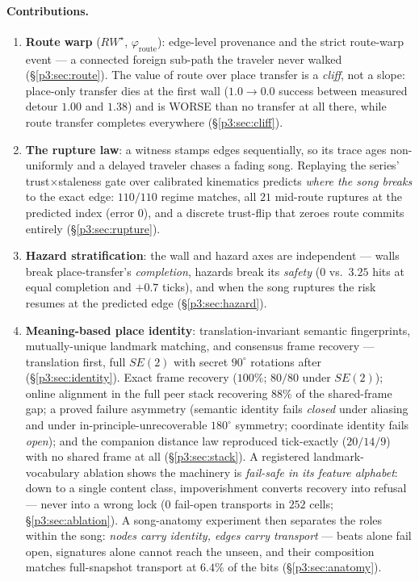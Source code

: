 \documentclass{article}
\newcommand{\rwstar}{RW^{\star}}
\newcommand{\phiroute}{\varphi_{\mathrm{route}}}
\begin{document}
\paragraph{Contributions.}
\begin{enumerate}[leftmargin=20pt,itemsep=2pt,topsep=2pt]
\item \textbf{Route warp} ($\rwstar$, $\phiroute$): edge-level
  provenance and the strict route-warp event --- a connected foreign
  sub-path the traveler never walked (\S\ref{p3:sec:route}). The value of
  route over place transfer is a \emph{cliff}, not a slope: place-only
  transfer dies at the first wall ($1.0 \to 0.0$ success between
  measured detour $1.00$ and $1.38$) and is WORSE than no transfer at
  all there, while route transfer completes everywhere
  (\S\ref{p3:sec:cliff}).
\item \textbf{The rupture law}: a witness stamps edges sequentially,
  so its trace ages non-uniformly and a delayed traveler chases a
  fading song. Replaying the series' trust$\times$staleness gate over
  calibrated kinematics predicts \emph{where the song breaks} to the
  exact edge: $110/110$ regime matches, all $21$ mid-route ruptures at
  the predicted index (error $0$), and a discrete trust-flip that
  zeroes route commits entirely (\S\ref{p3:sec:rupture}).
\item \textbf{Hazard stratification}: the wall and hazard axes are
  independent --- walls break place-transfer's \emph{completion},
  hazards break its \emph{safety} ($0$ vs.\ $3.25$ hits at equal
  completion and $+0.7$ ticks), and when the song ruptures the risk
  resumes at the predicted edge (\S\ref{p3:sec:hazard}).
\item \textbf{Meaning-based place identity}: translation-invariant
  semantic fingerprints, mutually-unique landmark matching, and
  consensus frame recovery --- translation first, full $SE(2)$ with
  secret $90^\circ$ rotations after (\S\ref{p3:sec:identity}). Exact
  frame recovery ($100\%$; $80/80$ under $SE(2)$); online alignment in
  the full peer stack recovering $88\%$ of the shared-frame gap; a
  proved failure asymmetry (semantic identity fails \emph{closed}
  under aliasing and under in-principle-unrecoverable $180^\circ$
  symmetry; coordinate identity fails \emph{open}); and the companion
  distance law reproduced tick-exactly ($20/14/9$) with no shared
  frame at all (\S\ref{p3:sec:stack}). A registered landmark-vocabulary
  ablation shows the machinery is \emph{fail-safe in its feature
  alphabet}: down to a single content class, impoverishment converts
  recovery into refusal --- never into a wrong lock ($0$ fail-open
  transports in $252$ cells; \S\ref{p3:sec:ablation}). A song-anatomy
  experiment then separates the roles within the song: \emph{nodes
  carry identity, edges carry transport} --- beats alone fail open,
  signatures alone cannot reach the unseen, and their composition
  matches full-snapshot transport at $6.4\%$ of the bits
  (\S\ref{p3:sec:anatomy}).
\end{enumerate}
\end{document}
